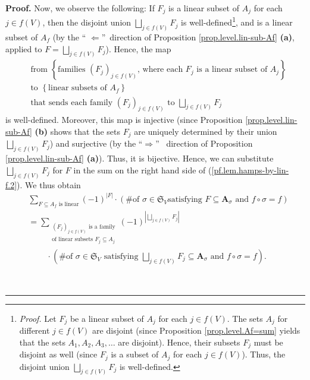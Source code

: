 \documentclass[numbers=enddot,12pt,final,onecolumn,notitlepage]{scrartcl}%
\numberwithin{exer}{section}
\theoremstyle{definition}
\newenvironment{proof}[1][Proof]{\noindent\textbf{#1.} }{\ \rule{0.5em}{0.5em}}
\let\sumnonlimits\sum
\let\sqcupnonlimits\bigsqcup
\renewcommand{\sum}{\sumnonlimits\limits}
\renewcommand{\bigsqcup}{\sqcupnonlimits\limits}
\newenvironment{verlong}{}{}
\begin{document}
\begin{verlong}
\begin{proof}
Now, we observe the following: If $F_{j}$ is a linear subset of $A_{j}$ for
each $j\in f\left(  V\right)  $, then the disjoint union $\bigsqcup_{j\in
f\left(  V\right)  }F_{j}$ is well-defined\footnote{\textit{Proof.} Let
$F_{j}$ be a linear subset of $A_{j}$ for each $j\in f\left(  V\right)  $. The
sets $A_{j}$ for different $j\in f\left(  V\right)  $ are disjoint (since
Proposition \ref{prop.level.Af=sum} yields that the sets $A_{1},A_{2}%
,A_{3},\ldots$ are disjoint). Hence, their subsets $F_{j}$ must be disjoint as
well (since $F_{j}$ is a subset of $A_{j}$ for each $j\in f\left(  V\right)
$). Thus, the disjoint union $\bigsqcup_{j\in f\left(  V\right)  }F_{j}$ is
well-defined.}, and is a linear subset of $A_{f}$ (by the \textquotedblleft%
$\Longleftarrow$\textquotedblright\ direction of Proposition
\ref{prop.level.lin-sub-Af} \textbf{(a)}, applied to $F=\bigsqcup_{j\in
f\left(  V\right)  }F_{j}$). Hence, the map%
\begin{align*}
&  \text{from }\left\{  \text{families }\left(  F_{j}\right)  _{j\in f\left(
V\right)  }\text{, where each }F_{j}\text{ is a linear subset of }%
A_{j}\right\} \\
&  \text{to }\left\{  \text{linear subsets of }A_{f}\right\} \\
&  \text{that sends each family }\left(  F_{j}\right)  _{j\in f\left(
V\right)  }\text{ to }\bigsqcup_{j\in f\left(  V\right)  }F_{j}%
\end{align*}
is well-defined. Moreover, this map is injective (since Proposition
\ref{prop.level.lin-sub-Af} \textbf{(b)} shows that the sets $F_{j}$ are
uniquely determined by their union $\bigsqcup_{j\in f\left(  V\right)  }F_{j}%
$) and surjective (by the \textquotedblleft$\Longrightarrow$\textquotedblright%
\ direction of Proposition \ref{prop.level.lin-sub-Af} \textbf{(a)}). Thus, it
is bijective. Hence, we can substitute $\bigsqcup_{j\in f\left(  V\right)
}F_{j}$ for $F$ in the sum on the right hand side of
(\ref{pf.lem.hamps-by-lin-f.2}). We thus obtain%
\begin{align}
&  \sum_{F\subseteq A_{f}\text{ is linear}}\left(  -1\right)  ^{\left\vert
F\right\vert }\cdot\left(  \text{\# of }\sigma\in\mathfrak{S}_{V}\text{
satisfying }F\subseteq\mathbf{A}_{\sigma}\text{ and }f\circ\sigma=f\right)
\nonumber\\
&  =\sum_{\substack{\left(  F_{j}\right)  _{j\in f\left(  V\right)  }\text{ is
a family}\\\text{of linear subsets }F_{j}\subseteq A_{j}}}\left(  -1\right)
^{\left\vert \bigsqcup_{j\in f\left(  V\right)  }F_{j}\right\vert }\nonumber\\
&  \ \ \ \ \ \ \ \ \ \ \cdot\left(  \text{\# of }\sigma\in\mathfrak{S}%
_{V}\text{ satisfying }\bigsqcup_{j\in f\left(  V\right)  }F_{j}%
\subseteq\mathbf{A}_{\sigma}\text{ and }f\circ\sigma=f\right)  .
\label{pf.lem.hamps-by-lin-f.5}%
\end{align}



\end{proof}
\end{verlong}
\end{document}
